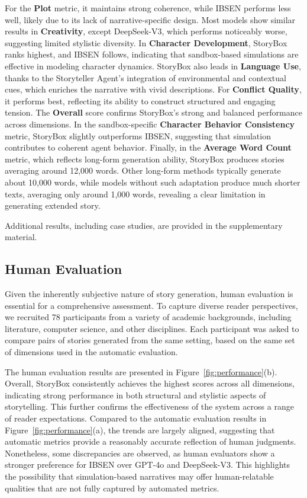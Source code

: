 \documentclass[letterpaper]{article} %
\begin{document}
For the \textbf{Plot} metric, it maintains strong coherence, while IBSEN performs less well, likely due to its lack of narrative-specific design. Most models show similar results in \textbf{Creativity}, except DeepSeek-V3, which performs noticeably worse, suggesting limited stylistic diversity. In \textbf{Character Development}, StoryBox ranks highest, and IBSEN follows, indicating that sandbox-based simulations are effective in modeling character dynamics. StoryBox also leads in \textbf{Language Use}, thanks to the Storyteller Agent's integration of environmental and contextual cues, which enriches the narrative with vivid descriptions. For \textbf{Conflict Quality}, it performs best, reflecting its ability to construct structured and engaging tension. The \textbf{Overall} score confirms StoryBox's strong and balanced performance across dimensions. In the sandbox-specific \textbf{Character Behavior Consistency} metric, StoryBox slightly outperforms IBSEN, suggesting that simulation contributes to coherent agent behavior. Finally, in the \textbf{Average Word Count} metric, which reflects long-form generation ability, StoryBox produces stories averaging around 12,000 words. Other long-form methods typically generate about 10,000 words, while models without such adaptation produce much shorter texts, averaging only around 1,000 words, revealing a clear limitation in generating extended story.

Additional results, including case studies, are provided in the supplementary material.

\subsection{Human Evaluation}

Given the inherently subjective nature of story generation, human evaluation is essential for a comprehensive assessment. To capture diverse reader perspectives, we recruited 78 participants from a variety of academic backgrounds, including literature, computer science, and other disciplines. Each participant was asked to compare pairs of stories generated from the same setting, based on the same set of dimensions used in the automatic evaluation.

The human evaluation results are presented in Figure~\ref{fig:performance}(b). Overall, StoryBox consistently achieves the highest scores across all dimensions, indicating strong performance in both structural and stylistic aspects of storytelling. This further confirms the effectiveness of the system across a range of reader expectations. Compared to the automatic evaluation results in Figure~\ref{fig:performance}(a), the trends are largely aligned, suggesting that automatic metrics provide a reasonably accurate reflection of human judgments. Nonetheless, some discrepancies are observed, as human evaluators show a stronger preference for IBSEN over GPT-4o and DeepSeek-V3. This highlights the possibility that simulation-based narratives may offer human-relatable qualities that are not fully captured by automated metrics.
\end{document}
